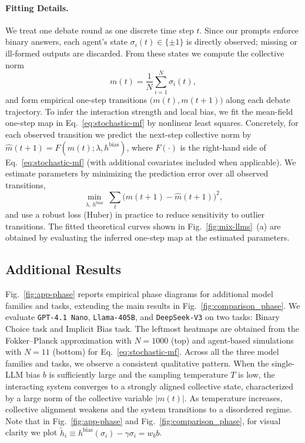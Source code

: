 \documentclass{article}
\theoremstyle{plain}
\theoremstyle{definition}
\theoremstyle{remark}
\begin{document}
\paragraph{Fitting Details. }
We treat one debate round as one discrete time step $t$. Since our prompts enforce binary answers, each agent's state $\sigma_i(t)\in\{\pm1\}$ is directly observed; missing or ill-formed outputs are discarded. From these states we compute the collective norm 
\begin{equation}
m(t)=\frac{1}{N}\sum_{i=1}^{N}\sigma_i(t),
\end{equation}
and form empirical one-step transitions $\big(m(t),m(t{+}1)\big)$ along each debate trajectory. 
To infer the interaction strength and local bias, we fit the mean-field one-step map in Eq.~\eqref{eq:stochastic-mf} by nonlinear least squares. Concretely, for each observed transition we predict the next-step collective norm by
$\hat m(t{+}1)=F\!\left(m(t);\lambda, h^{\mathrm{bias}}\right)$, 
where $F(\cdot)$ is the right-hand side of Eq.~\eqref{eq:stochastic-mf} (with additional covariates included when applicable). We estimate parameters by minimizing the prediction error over all observed transitions,
\begin{equation}
\min_{\lambda,\,h^{\mathrm{bias}}}\;\sum_{t}\Big(m(t{+}1)-\hat m(t{+}1)\Big)^2,
\end{equation}
and use a robust loss (Huber) in practice to reduce sensitivity to outlier transitions. The fitted theoretical curves shown in Fig.~\ref{fig:mix-llms}~(a) are obtained by evaluating the inferred one-step map at the estimated parameters. 


\subsection{Additional Results}\label{sec:synthetic_additional_results}
Fig.~\ref{fig:app-phase} reports empirical phase diagrams for additional model families and tasks, extending the main results in Fig.~\ref{fig:comparison_phase}. We evaluate \texttt{GPT-4.1 Nano}, \texttt{Llama-405B}, and \texttt{DeepSeek-V3} on two tasks: Binary Choice task and Implicit Bias task. 
The leftmost heatmaps are obtained from the Fokker--Planck approximation with $N=1000$ (top) and agent-based simulations with $N=11$ (bottom) for Eq.~\eqref{eq:stochastic-mf}. 
Across all the three model families and tasks, we observe a consistent qualitative pattern. When the single-LLM bias $b$ is sufficiently large and the sampling temperature $T$ is low, the interacting system converges to a strongly aligned collective state, characterized by a large norm of the collective variable $|m(t)|$. As temperature increases, collective alignment weakens and the system transitions to a disordered regime. 
Note that in Fig.~\ref{fig:app-phase} and Fig.~\ref{fig:comparison_phase}, for visual clarity we plot
$\tilde h_i \equiv h^{\textrm{bias}}(\sigma_i) - \gamma \sigma_i = w_b b$. 
\end{document}
